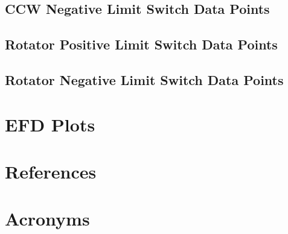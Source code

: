 \documentclass[SE,lsstdraft,authoryear,toc]{lsstdoc}
\begin{document}
\subsection{CCW Negative Limit Switch Data Points}
\subsection{Rotator Positive Limit Switch Data Points}
\subsection{Rotator Negative Limit Switch Data Points}

\section{EFD Plots}


\section{References} \label{sec:bib}
\renewcommand{\refname}{} %


\section{Acronyms} \label{sec:acronyms}

\end{document}
